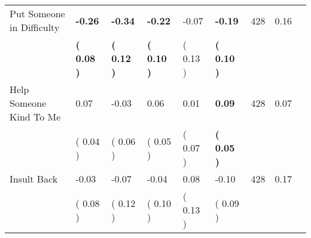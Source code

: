 \begin{tabular}{L{6.2cm} C{1.8cm} C{1.8cm} C{1.8cm} C{1.8cm} C{1.8cm} C{1.8cm} C{0.3cm} C{0.3cm}}
Put Someone in Difficulty & \textbf{    -0.26} & \textbf{    -0.34} & \textbf{    -0.22} &     -0.07 & \textbf{    -0.19}  & 428 &       0.16 \\ 
 & \textbf{(     0.08 )} & \textbf{(     0.12 )} & \textbf{(     0.10 )} & (     0.13 ) & \textbf{(     0.10 )}  & \\
Help Someone Kind To Me &      0.07 &     -0.03 &      0.06 &      0.01 & \textbf{     0.09}  & 428 &       0.07 \\ 
 & (     0.04 ) & (     0.06 ) & (     0.05 ) & (     0.07 ) & \textbf{(     0.05 )}  & \\
Insult Back &     -0.03 &     -0.07 &     -0.04 &      0.08 &     -0.10  & 428 &       0.17 \\ 
 & (     0.08 ) & (     0.12 ) & (     0.10 ) & (     0.13 ) & (     0.09 )  & \\
\bottomrule
\end{tabular}
